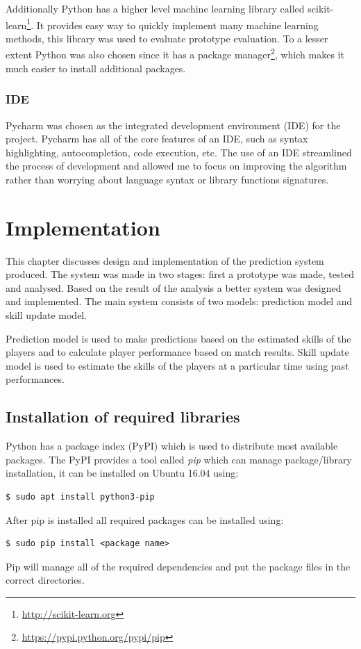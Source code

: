 \documentclass[12pt,a4paper]{book}
\begin{document}
Additionally Python has a higher level machine learning library called scikit-learn\footnote{\url{http://scikit-learn.org}}.
It provides easy way to quickly implement many machine learning methods, this library was used to evaluate prototype evaluation.
To a lesser extent Python was also chosen since it has a package manager\footnote{\url{https://pypi.python.org/pypi/pip}}, which makes it much easier to install additional packages.

\subsection{IDE}
Pycharm was chosen as the integrated development environment (IDE) for the project.
Pycharm has all of the core features of an IDE, such as syntax highlighting, autocompletion, code execution, etc.
The use of an IDE streamlined the process of development and allowed me to focus on improving the algorithm rather than worrying about language syntax or library functions signatures. 


\chapter{Implementation}
This chapter discusses design and implementation of the prediction system produced.
The system was made in two stages: first a prototype was made, tested and analysed.
Based on the result of the analysis a better system was designed and implemented.
The main system consists of two models: prediction model and skill update model.

Prediction model is used to make predictions based on the estimated skills of the players and to calculate player performance based on match results.
Skill update model is used to estimate the skills of the players at a particular time using past performances.
\section{Installation of required libraries}
Python has a package index (PyPI) which is used to distribute most available packages.
The PyPI provides a tool called \emph{pip} which can manage package/library installation, it can be installed on Ubuntu 16.04 using:
\begin{verbatim}
$ sudo apt install python3-pip
\end{verbatim}
After pip is installed all required packages can be installed using:
\begin{verbatim}
$ sudo pip install <package name>
\end{verbatim}
Pip will manage all of the required dependencies and put the package files in the correct directories.
\end{document}
